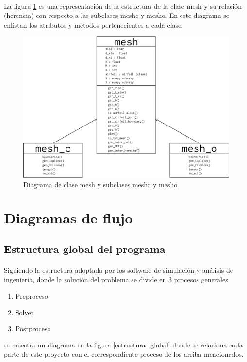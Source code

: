 \documentclass[letterpaper, openright, 12pt]{book}
\begin{document}
    \paragraph*{}
        La figura \ref{mesh_class} es una representación de la estructura de la
        clase mesh y su relación (herencia) con respecto a las subclases
        mesh\textunderscore c y mesh\textunderscore o. En este diagrama se
        enlistan los atributos y métodos pertenecientes a cada clase.
    \begin{figure}
        \centering
        \includegraphics[keepaspectratio, width=205mm]{./Imagenes/mesh_class}
        \caption{Diagrama de clase mesh y subclases mesh\textunderscore c y
            mesh\textunderscore o}
        \label{mesh_class}
    \end{figure}

    \section{Diagramas de flujo}

    \subsection{Estructura global del programa}
    \paragraph*{}
        Siguiendo la estructura adoptada por los software de simulación y
        análisis de ingeniería, donde la solución del problema se divide en 3
        procesos generales
        \begin{enumerate}
            \item Preproceso
            \item Solver
            \item Postproceso
        \end{enumerate}
        se muestra un diagrama en la figura \ref{estructura_global} donde se
        relaciona cada parte de este proyecto con el correspondiente proceso de
        los arriba mencionados.
\end{document}
